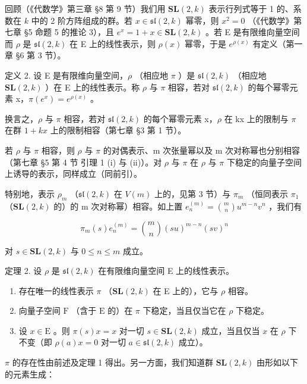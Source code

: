 回顾（《代数学》第三章 §8 第 9 节）我们用 \(\mathbf{SL}(2,k)\) 表示行列式等于 1 的、系数在 \(k\) 中的 2 阶方阵组成的群。若 \(x\in \mathfrak{sl}(2,k)\) 幂零，则 \(x^{2} = 0\) （《代数学》第七章 §5 命题 5 的推论 3），且 \(e^x = 1 + x\in \mathbf{SL}(2,k)\) 。若 E 是有限维向量空间而 \(\rho\) 是 \(\mathfrak{sl}(2,k)\) 在 E 上的线性表示，则 \(\rho (x)\) 幂零，于是 \(e^{\rho (x)}\) 有定义（第一章 §6 第 3 节）。

定义 2. 设 E 是有限维向量空间，\(\rho\) （相应地 \(\pi\) ）是 \(\mathfrak{sl}(2,k)\) （相应地 \(\mathbf{SL}(2,k)\) ）在 E 上的线性表示。称 \(\rho\) 与 \(\pi\) 相容，若对 \(\mathfrak{sl}(2,k)\) 的每个幂零元素 x，\(\pi(e^{x}) = e^{\rho(x)}\) 。

换言之，\(\rho\) 与 \(\pi\) 相容，若对 \(\mathfrak{sl}(2,k)\) 的每个幂零元素 x，\(\rho\) 在 kx 上的限制与 \(\pi\) 在群 \(1 + kx\) 上的限制相容（第七章 §3 第 1 节）。

若 \(\rho\) 与 \(\pi\) 相容，则 \(\rho\) 与 \(\pi\) 的对偶表示、m 次张量幂以及 m 次对称幂也分别相容（第七章 §5 第 4 节 引理 1 (i) 与 (ii)）。对 \(\rho\) 与 \(\pi\) 在 \(\rho\) 与 \(\pi\) 下稳定的向量子空间上诱导的表示，同样成立（同前引）。

特别地，表示 \(\rho_{m}\) （\(\mathfrak{sl}(2,k)\) 在 \(V(m)\) 上的，见第 3 节）与 \(\pi_{m}\) （恒同表示 \(\pi_{1}\) （\(\mathbf{SL}(2,k)\) 的）的 m 次对称幂）相容。如上置 \(e_{n}^{(m)} = \binom{m}{n} u^{m-n} v^{n}\) ，我们有

\[
\pi_ {m} (s) e _ {n} ^ {(m)} = \binom {m} {n} (s u) ^ {m - n} (s v) ^ {n}\tag{3}
\]

对 \(s \in \mathbf{SL}(2, k)\) 与 \(0 \leq n \leq m\) 成立。

定理 2. 设 \(\rho\) 是 \(\mathfrak{sl}(2,k)\) 在有限维向量空间 E 上的线性表示。

\begin{enumerate}
\def\labelenumi{(\roman{enumi})}
\item
  存在唯一的线性表示 \(\pi\) （\(\mathbf{SL}(2,k)\) 在 E 上的），它与 \(\rho\) 相容。
\item
  向量子空间 \(\mathrm{F}\) （含于 \(\mathrm{E}\) 的）在 \(\pi\) 下稳定，当且仅当它在 \(\rho\) 下稳定。
\item
  设 \(x \in \mathrm{E}\) 。则 \(\pi(s)x = x\) 对一切 \(s \in \mathbf{SL}(2,k)\) 成立，当且仅当 \(x\) 在 \(\rho\) 下不变（即 \(\rho(a)x = 0\) 对一切 \(a \in \mathfrak{sl}(2,k)\) 成立）。
\end{enumerate}

\(\pi\) 的存在性由前述及定理 1 得出。另一方面，我们知道群 \(\mathbf{SL}(2,k)\) 由形如以下的元素生成：

